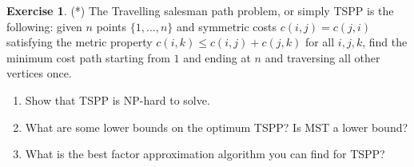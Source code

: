 \documentclass[11pt]{article}
\theoremstyle{definition}
\newtheorem{exercise}{Exercise}
\begin{document}
\begin{exercise}(*)
The Travelling salesman path problem, or simply TSPP is the following: given $n$ points $\{1,\ldots,n\}$ and symmetric costs $c(i,j) = c(j,i)$
satisfying the metric property $c(i,k) \leq c(i,j) + c(j,k)$ for all $i,j,k$, find the minimum cost path starting from $1$ and ending at $n$ and traversing all other
vertices once. 
\begin{enumerate}
\item Show that TSPP is NP-hard to solve.
\item What are some lower bounds on the optimum TSPP? Is MST a lower bound?
\item What is the best factor approximation algorithm you can find for TSPP?
\end{enumerate}

\end{exercise}
\end{document}
